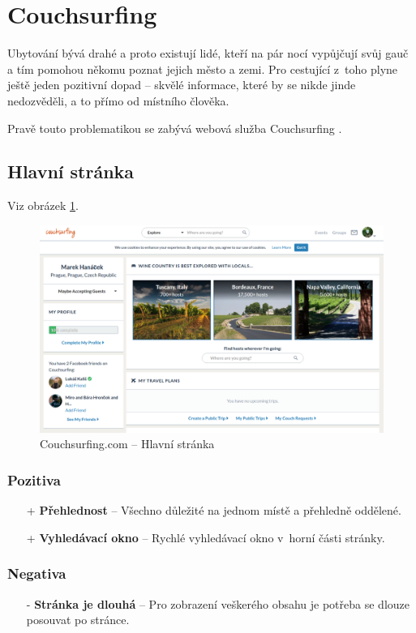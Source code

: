 \section{Couchsurfing}
\label{analyza:couchsurfing}

Ubytování bývá drahé a proto existují lidé, kteří na pár nocí vypůjčují svůj gauč a tím pomohou někomu poznat jejich město a zemi. Pro cestující z~toho plyne ještě jeden pozitivní dopad -- skvělé informace, které by se nikde jinde nedozvěděli, a to přímo od místního člověka.

Pravě touto problematikou se zabývá webová služba Couchsurfing \cite{couchsurfing}.
\subsection{Hlavní stránka}
Viz obrázek \ref{fig:couchsurfing:homepage}.
\begin{figure}[h]
    \centering
    \includegraphics[width=1.0\textwidth]{media/couchsurfing/homepage.png}
    \caption{Couchsurfing.com -- Hlavní stránka}
    \label{fig:couchsurfing:homepage}
\end{figure}
\subsubsection*{Pozitiva}
\begin{itemize}
    \item[+] \textbf{Přehlednost} -- Všechno důležité na jednom místě a přehledně oddělené.
    \item[+] \textbf{Vyhledávací okno} -- Rychlé vyhledávací okno v~horní části stránky.
\end{itemize}
\subsubsection*{Negativa}
\begin{itemize}
    \item[-] \textbf{Stránka je dlouhá} -- Pro zobrazení veškerého obsahu je potřeba se dlouze posouvat po stránce.
\end{itemize}


